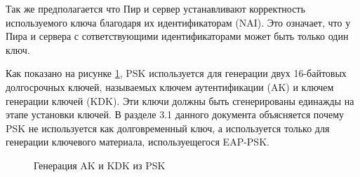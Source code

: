 Так же предполагается что Пир и сервер устанавливают корректность используемого ключа благодаря их идентификаторам (NAI). Это означает, что у Пира и сервера с сответствующими идентификаторами может быть только один ключ.

Как показано на рисунке \ref{img:ak_kdk_psk}, PSK используется для генерации двух 16-байтовых долгосрочных ключей, называемых ключем аутентификации (AK) и ключем генерации ключей (KDK). Эти ключи должны быть сгенерированы единажды на этапе установки ключей. В разделе 3.1 данного документа объясняется почему PSK не используется как долговременный ключ, а используется только для генерации ключевого материала, используещегося EAP-PSK.

\begin{figure}[h!]
\caption{Генерация AK и KDK из PSK}
\label{img:ak_kdk_psk}
\end{figure}
